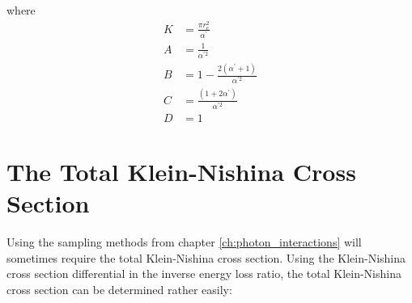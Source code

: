 where
\begin{align}
  K & = \frac{\pi r_e^2}{\alpha^{'}} \nonumber \\
  A & = \frac{1}{\alpha^{'2}} \nonumber \\
  B & = 1 - \frac{2(\alpha^{'}+1)}{\alpha^{'2}} \nonumber \\
  C & = \frac{(1+2\alpha^{'})}{\alpha^{'2}} \nonumber \\
  D & = 1 \nonumber 
\end{align}

\section{The Total Klein-Nishina Cross Section}
Using the sampling methods from chapter \ref{ch:photon_interactions} will 
sometimes require the total Klein-Nishina cross section. Using the 
Klein-Nishina cross section differential in the inverse energy loss ratio,
the total Klein-Nishina cross section can be determined rather easily:
